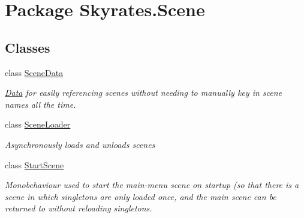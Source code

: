 \hypertarget{namespace_skyrates_1_1_scene}{\section{Package Skyrates.\-Scene}
\label{namespace_skyrates_1_1_scene}
}
\subsection*{Classes}
\begin{DoxyCompactItemize}
\item 
class \hyperlink{class_skyrates_1_1_scene_1_1_scene_data}{Scene\-Data}
\begin{DoxyCompactList}\small\item\em \hyperlink{namespace_skyrates_1_1_data}{Data} for easily referencing scenes without needing to manually key in scene names all the time. \end{DoxyCompactList}\item 
class \hyperlink{class_skyrates_1_1_scene_1_1_scene_loader}{Scene\-Loader}
\begin{DoxyCompactList}\small\item\em Asynchronously loads and unloads scenes \end{DoxyCompactList}\item 
class \hyperlink{class_skyrates_1_1_scene_1_1_start_scene}{Start\-Scene}
\begin{DoxyCompactList}\small\item\em Monobehaviour used to start the main-\/menu scene on startup (so that there is a scene in which singletons are only loaded once, and the main scene can be returned to without reloading singletons. \end{DoxyCompactList}\end{DoxyCompactItemize}
